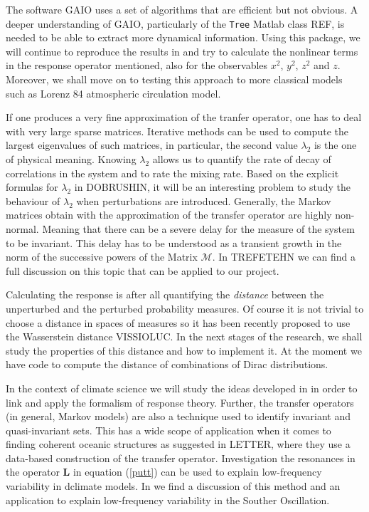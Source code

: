 The software GAIO uses a set of algorithms that are efficient but not obvious. A deeper understanding of GAIO, particularly of the \texttt{Tree} Matlab class REF, is needed to be able to extract more dynamical information. Using this package, we will continue to reproduce the results in \cite{lucarini} and try to calculate the nonlinear terms in the response operator mentioned, also for the observables $x^2$, $y^2$, $z^2$ and $z$. Moreover, we shall move on to testing this approach to more classical models such as Lorenz 84 atmospheric circulation model.

If one produces a very fine approximation of the tranfer operator, one has to deal with very large sparse matrices. Iterative methods can be used to compute the largest eigenvalues of such matrices, in particular, the second value $\lambda_2$ is the one of physical meaning. Knowing $\lambda_2$ allows us to quantify the rate of decay of correlations in the system and to rate the mixing rate. Based on the explicit formulas for $\lambda_2$ in DOBRUSHIN, it will be an interesting problem to study the behaviour of $\lambda_2$ when perturbations are introduced. Generally, the Markov matrices obtain with the approximation of the transfer operator are highly non-normal. Meaning that there can be a severe delay for the measure of the system to be invariant. This delay has to be understood as a transient growth in the norm of the successive powers of the Matrix $\mathcal{M}$. In TREFETEHN we can find a full discussion on this topic that can be applied to our project.

Calculating the response is after all quantifying the \emph{distance} between the unperturbed and the perturbed probability measures. Of course it is not trivial to choose a distance in spaces of measures so it has been recently proposed to use the Wasserstein distance VISSIOLUC. In the next stages of the research, we shall study the properties of this distance and how to implement it. At the moment we have code to compute the distance of combinations of Dirac distributions.

In the context of climate science we will study the ideas developed in \cite{leith} in order to link and apply the formalism of response theory. Further, the transfer operators (in general, Markov models) are also a technique used to identify invariant and quasi-invariant sets. This has a wide scope of application when it comes to finding coherent oceanic structures as suggested in LETTER, where they use a data-based construction of the transfer operator. Investigation the resonances in the operator $\mathbf{L}$ in equation (\ref{putt}) can be used to explain low-frequency variability in dclimate models. In \cite{chekroun} we find a discussion of this method and an application to explain low-frequency variability in the Souther Oscillation.

